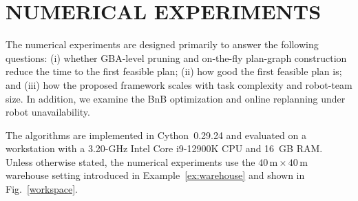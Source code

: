 \documentclass[lettersize,journal]{IEEEtran}
\theoremstyle{italiclemma}
\theoremstyle{italiclemma}
\theoremstyle{definition}
\begin{document}
\section{NUMERICAL EXPERIMENTS}
\label{sec:numerical_experiments}
The numerical experiments are designed primarily to answer the following questions: (i) whether GBA-level pruning and on-the-fly plan-graph construction reduce the time to the first feasible plan; (ii) how good the first feasible plan is; and (iii) how the proposed framework scales with task complexity and robot-team size. In addition, we examine the BnB optimization and online replanning under robot unavailability.


The algorithms are implemented in Cython~0.29.24 and evaluated on a workstation with a 3.20-GHz Intel Core i9-12900K CPU and 16~GB RAM. Unless otherwise stated, the numerical experiments use the $40\,\mathrm{m}\times40\,\mathrm{m}$ warehouse setting introduced in
Example~\ref{ex:warehouse} and shown in Fig.~\ref{workspace}.

\end{document}
